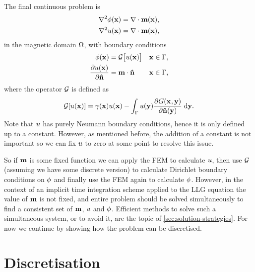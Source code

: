 The final continuous problem is
\begin{equation}
  \begin{aligned}
    \nabla^2 \phi(\boldsymbol{\mathrm{x}}) &= \nabla \cdot \boldsymbol{\mathrm{m}}(\boldsymbol{\mathrm{x}}),  \\
    \nabla^2 u(\boldsymbol{\mathrm{x}}) &= \nabla \cdot \boldsymbol{\mathrm{m}}(\boldsymbol{\mathrm{x}}),
  \end{aligned}
  \label{eq:phi-bem-continuous}
\end{equation}
in the magnetic domain $\Omega$, with boundary conditions
\begin{equation}
  \begin{aligned}
    \phi(\boldsymbol{\mathrm{x}}) &= \mathcal{G} \big[ u(\boldsymbol{\mathrm{x}}) \big]      & \boldsymbol{\mathrm{x}} \in {\Gamma}, \\
    \frac{\partial u(\boldsymbol{\mathrm{x}})}{\partial \boldsymbol{\mathrm{\hat{n}}}} &= \boldsymbol{\mathrm{m}} \cdot \boldsymbol{\mathrm{\hat{n}}}  & \boldsymbol{\mathrm{x}} \in {\Gamma},
    \label{eq:phi-bem-continuous-bc}
  \end{aligned}
\end{equation}
where the operator $\mathcal{G}$ is defined as
\begin{equation}
  \mathcal{G} {\left[ u(\boldsymbol{\mathrm{x}}) \right]} = \gamma(\boldsymbol{\mathrm{x}}) u(\boldsymbol{\mathrm{x}})
        - \int_{{\Gamma}} u(\boldsymbol{\mathrm{y}}) \frac{\partial G(\boldsymbol{\mathrm{x}}_{},\boldsymbol{\mathrm{y}})}{\partial \boldsymbol{\mathrm{\hat{n}}}(\boldsymbol{\mathrm{y}})} {\; \mathrm{{d}}} \boldsymbol{\mathrm{y}}.
\end{equation}
Note that $u$ has purely Neumann boundary conditions, hence it is only defined up to a constant.
However, as mentioned before, the addition of a constant is not important so we can fix $u$ to zero at some point to resolve this issue.

So if $\boldsymbol{\mathrm{m}}$ is some fixed function we can apply the FEM to calculate $u$, then use $\mathcal{G}$ (assuming we have some discrete version) to calculate Dirichlet boundary conditions on $\phi$ and finally use the FEM again to calculate $\phi$.
However, in the context of an implicit time integration scheme applied to the LLG equation the value of $\boldsymbol{\mathrm{m}}$ is not fixed, and entire problem should be solved simultaneously to find a consistent set of $\boldsymbol{\mathrm{m}}$, $u$ and $\phi$.
Efficient methods to solve such a simultaneous system, or to avoid it, are the topic of \cref{sec:solution-strategies}.
For now we continue by showing how the problem can be discretised.

\section{Discretisation}
\label{sec:discretisation}

\newsubcommand{\tbfone}{\tbf}{}
\newsubcommand{\tbfm}{\tbf}{}

